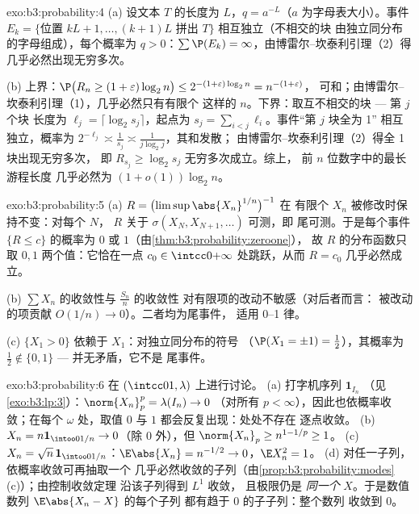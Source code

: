 \begin{solution}{exo:b3:probability:4}
(a) 设文本 $T$ 的长度为 $L$，$q = a^{-L}$（$a$
为字母表大小）。事件 $E_k = \{$位置 $kL+1,
\dots, (k+1)L$ 拼出 $T\}$ 相互独立（不相交的块
由独立同分布的字母组成），每个概率为 $q > 0$：$\sum\P(E_k)
= \infty$，由博雷尔–坎泰利引理（2）得
几乎必然出现无穷多次。

(b) 上界：$\P\bigl(R_n \geq (1+\varepsilon)\log_2n\bigr)
\leq 2^{-(1+\varepsilon)\log_2n} = n^{-(1+\varepsilon)}$，
可和；由博雷尔–坎泰利引理（1），几乎必然只有有限个
这样的 $n$。下界：取互不相交的块 --- 第 $j$ 个块
长度为 $\ell_j = \lceil\log_2s_j\rceil$，起点为 $s_j =
\sum_{i<j}\ell_i$。事件“第 $j$ 块全为 1”
相互独立，概率为 $2^{-\ell_j} \asymp
\frac1{s_j} \asymp \frac1{j\log_2 j}$，其和发散；
由博雷尔–坎泰利引理（2）得全 1 块出现无穷多次，
即 $R_{s_j} \geq \log_2 s_j$ 无穷多次成立。综上，
前 $n$ 位数字中的最长游程长度
几乎必然为 $(1 + o(1))\log_2n$。
\end{solution}

\begin{solution}{exo:b3:probability:5}
(a) $R = \bigl(\limsup\abs{X_n}^{1/n}\bigr)^{-1}$ 在
有限个 $X_n$ 被修改时保持不变：对每个 $N$，
$R$ 关于 $\sigma(X_N, X_{N+1}, \dots)$ 可测，即
尾可测。于是每个事件 $\{R \leq c\}$
的概率为 $0$ 或 $1$（由\cref{thm:b3:probability:zeroone}），
故 $R$ 的分布函数只取
$0, 1$ 两个值：它恰在一点 $c_0 \in
\intcc0{+\infty}$ 处跳跃，从而 $R = c_0$ 几乎必然成立。

(b) $\sum X_n$ 的收敛性与 $\frac{S_n}n$ 的收敛性
对有限项的改动不敏感（对后者而言：
被改动的项贡献 $O(1/n) \to 0$）。二者均为尾事件，
适用 0–1 律。

(c) $\{X_1 > 0\}$ 依赖于 $X_1$：对独立同分布的符号
（$\P(X_1 = \pm1) = \frac12$），其概率为 $\frac12
\notin \{0,1\}$ --- 并无矛盾，它不是
尾事件。
\end{solution}

\begin{solution}{exo:b3:probability:6}
在 $(\intcc01, \lambda)$ 上进行讨论。
(a) 打字机序列 $\mathbf 1_{I_n}$
（见\cref{exo:b3:lp:3}）：$\norm{X_n}_p^p = \lambda(I_n) \to 0$
（对所有 $p < \infty$），因此也依概率收敛；在每个
$\omega$ 处，取值 $0$ 与 $1$ 都会反复出现：处处不存在
逐点收敛。
(b) $X_n = n\mathbf 1_{\intoo0{1/n}} \to 0$（除 $0$ 外），但
$\norm{X_n}_p \geq n^{1 - 1/p} \geq 1$。
(c) $X_n = \sqrt n\,\mathbf 1_{\intoo0{1/n}}$：$\E\abs{X_n} =
n^{-1/2} \to 0$，$\E X_n^2 = 1$。
(d) 对任一子列，依概率收敛可再抽取一个
几乎必然收敛的子列（由\cref{prop:b3:probability:modes}(c)）；由控制收敛定理
沿该子列得到 $L^1$ 收敛，
且极限仍是 \emph{同一个}
$X$。于是数值数列 $\E\abs{X_n - X}$ 的每个子列
都有趋于 $0$ 的子子列：整个数列
收敛到 $0$。
\end{solution}

